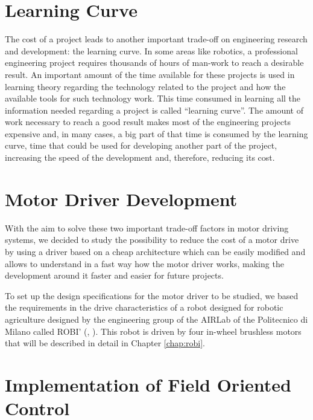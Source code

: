 \section{Learning Curve}\label{sec:objectives}

The cost of a project leads to another important trade-off on engineering research and development: the learning curve. In some areas like robotics, a professional engineering project requires thousands of hours of man-work to reach a desirable result. An important amount of the time available for these projects is used in learning theory regarding the technology related to the project and how the available tools for such technology work. This time consumed in learning all the information needed regarding a project is called “learning curve”. The amount of work necessary to reach a good result makes most of the engineering projects expensive and, in many cases, a big part of that time is consumed by the learning curve, time that could be used for developing another part of the project, increasing the speed of the development and, therefore, reducing its cost.

\section{Motor Driver Development}\label{sec:methods}

With the aim to solve these two important trade-off factors in motor driving systems, we decided to study the possibility to reduce the cost of a motor drive by using a driver based on a cheap architecture which can be easily modified and allows to understand in a fast way how the motor driver works, making the development around it faster and easier for future projects.

To set up the design specifications for the motor driver to be studied, we based the requirements in the drive characteristics of a robot designed for robotic agriculture designed by the engineering group of the AIRLab of the Politecnico di Milano called ROBI' (\citeauthor{robi:2017}, \citeyear{robi:2017}). This robot is driven by four in-wheel brushless motors that will be described in detail in Chapter \ref{chap:robi}.\\

\section{Implementation of Field Oriented Control}\label{sec:novelties}

